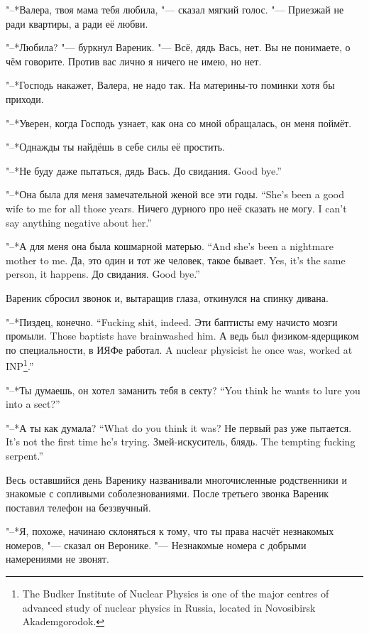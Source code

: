 "--*Валера, твоя мама тебя любила, "--- сказал мягкий голос.
"--- Приезжай не ради квартиры, а ради её любви.

"--*Любила? "--- буркнул Вареник.
"--- Всё, дядь Вась, нет.
Вы не понимаете, о чём говорите.
Против вас лично я ничего не имею, но нет.

"--*Господь накажет, Валера, не надо так.
На материны-то поминки хотя бы приходи.

"--*Уверен, когда Господь узнает, как она со мной обращалась, он меня поймёт.

"--*Однажды ты найдёшь в себе силы её простить.

"--*Не буду даже пытаться, дядь Вась.
{До свидания.}
{Good bye.''}

{"--*Она была для меня замечательной женой все эти годы.}
{``She's been a good wife to me for all those years.}
{Ничего дурного про неё сказать не могу.}
{I can't say anything negative about her.''}

{"--*А для меня она была кошмарной матерью.}
{``And she's been a nightmare mother to me.}
{Да, это один и тот же человек, такое бывает.}
{Yes, it's the same person, it happens.}
{До свидания.}
{Good bye.''}

Вареник сбросил звонок и, вытаращив глаза, откинулся на спинку дивана.

{"--*Пиздец, конечно.}
{``Fucking shit, indeed.}
{Эти баптисты ему начисто мозги промыли.}
{Those baptists have brainwashed him.}
{А ведь был физиком-ядерщиком по специальности, в ИЯФе работал.}
{A nuclear physicist he once was, worked at INP\footnote{The Budker Institute of Nuclear Physics is one of the major centres of advanced study of nuclear physics in Russia, located in Novosibirsk Akademgorodok.}.''}

{"--*Ты думаешь, он хотел заманить тебя в секту?}
{``You think he wants to lure you into a sect?''}

{"--*А ты как думала?}
{``What do you think it was?}
{Не первый раз уже пытается.}
{It's not the first time he's trying.}
{Змей-искуситель, блядь.}
{The tempting fucking serpent.''}

Весь оставшийся день Варенику названивали многочисленные родственники и знакомые с сопливыми соболезнованиями.
После третьего звонка Вареник поставил телефон на беззвучный.

"--*Я, похоже, начинаю склоняться к тому, что ты права насчёт незнакомых номеров, "--- сказал он Веронике.
"--- Незнакомые номера с добрыми намерениями не звонят.

